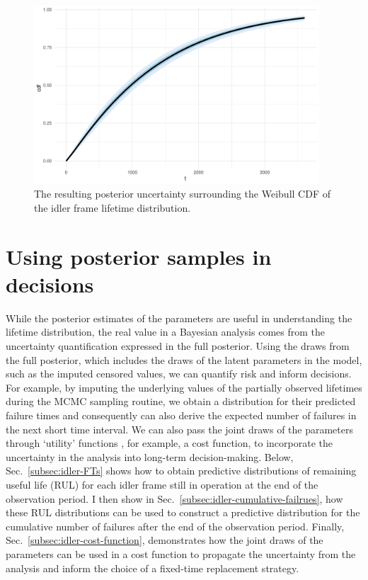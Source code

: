 \begin{figure}[tbp]
  \centering
  \includegraphics[width=0.95\textwidth]{./figures/ch-3/idler-frame-post-CDF.pdf}
  \caption{The resulting posterior uncertainty surrounding the Weibull CDF of the idler frame lifetime distribution.}
  \label{fig:idler-frames-post-cdf}
\end{figure}

\section{Using posterior samples in decisions} \label{sec:idler-frames-using-posterior}

While the posterior estimates of the parameters are useful in understanding the lifetime distribution, the real value in a Bayesian analysis comes from the uncertainty quantification expressed in the full posterior. Using the draws from the full posterior, which includes the draws of the latent parameters in the model, such as the imputed censored values, we can quantify risk and inform decisions. For example, by imputing the underlying values of the partially observed lifetimes during the MCMC sampling routine, we obtain a distribution for their predicted failure times and consequently can also derive the expected number of failures in the next short time interval. We can also pass the joint draws of the parameters through `utility' functions \citep[Chap.~9]{BDA2020}, for example, a cost function, to incorporate the uncertainty in the analysis into long-term decision-making. Below, Sec.~\ref{subsec:idler-FTs} shows how to obtain predictive distributions of remaining useful life (RUL) for each idler frame still in operation at the end of the observation period. I then show in Sec.~\ref{subsec:idler-cumulative-failrues}, how these RUL distributions can be used to construct a predictive distribution for the cumulative number of failures after the end of the observation period. Finally, Sec.~\ref{subsec:idler-cost-function}, demonstrates how the joint draws of the parameters can be used in a cost function to propagate the uncertainty from the analysis and inform the choice of a fixed-time replacement strategy.

